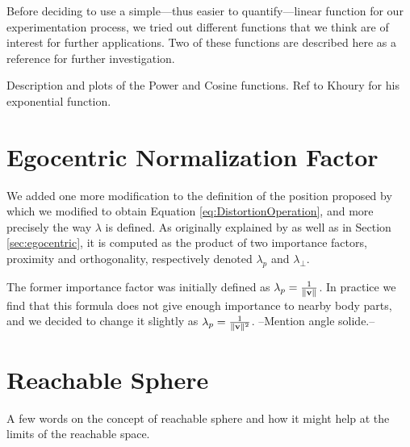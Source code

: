 Before deciding to use a simple---thus easier to quantify---linear function for our experimentation process, we tried out different functions that we think are of interest for further applications. Two of these functions are described here as a reference for further investigation.



Description and plots of the Power and Cosine functions. Ref to Khoury \cite{khoury2015human} for his exponential function.

\section{Egocentric Normalization Factor}

We added one more modification to the definition of the position proposed by \cite{molla2017egocentric} which we modified to obtain Equation \ref{eq:DistortionOperation}, and more precisely the way $\lambda $ is defined. As originally explained by \cite{molla2016precise} as well as in Section \ref{sec:egocentric}, it is computed as the product of two importance factors, proximity and orthogonality, respectively denoted $\lambda_p$ and $\lambda_\perp $.

The former importance factor was initially defined as $\lambda_p = \frac{1}{\lVert\mathbf{v}\rVert}$. In practice we find that this formula does not give enough importance to nearby body parts, and we decided to change it slightly as $\lambda_p = \frac{1}{\lVert\mathbf{v}\rVert^2}$. --Mention angle solide.-- %

\section{Reachable Sphere}

A few words on the concept of reachable sphere and how it might help at the limits of the reachable space.
